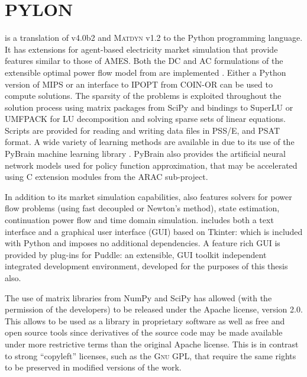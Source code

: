 \section{PYLON}
\label{sec:pylon}

\pylon is a translation of \matpower v4.0b2 and \textsc{Matdyn} v1.2 to the
Python programming language.  It has extensions for agent-based electricity
market simulation that provide features similar to those of AMES.  Both the DC
and AC formulations of the extensible optimal power flow model from \matpower
are implemented \cite{zimmerman:mp_pes}.  Either a Python version of MIPS or an
interface to IPOPT from COIN-OR can be used to compute solutions.  The sparsity
of the problems is exploited throughout the solution process using matrix
packages from SciPy and bindings to SuperLU or UMFPACK for LU decomposition and
solving sparse sets of linear equations. Scripts are provided for reading and
writing data files in PSS/E, \matpower and PSAT format. A wide variety of
learning methods are available in \pylon due to its use of the PyBrain machine
learning library \cite{schaul:2010}.  PyBrain also provides the artificial
neural network models used for policy function approximation, that may be
accelerated using C extension modules from the ARAC sub-project.

In addition to its market simulation capabilities, \pylon also features solvers
for power flow problems (using fast decoupled or Newton's method), state
estimation, continuation power flow and time domain simulation.  \pylon includes
both a text interface and a graphical user interface (GUI) based on Tkinter:
which is included with Python and imposes no additional dependencies.  A feature
rich GUI is provided by plug-ins for Puddle: an extensible, GUI toolkit
independent integrated development environment, developed for the purposes of
this thesis also.

The use of matrix
libraries from NumPy and SciPy has allowed \pylon (with the permission of the
\matpower developers) to be released under the Apache license, version 2.0. This
allows \pylon to be used as a library in proprietary software as well as
free and open source tools since derivatives of the source code may be made
available under more restrictive terms than the original Apache license.  This
is in contrast to strong ``copyleft'' licenses, such as the \textsc{Gnu} GPL,
that require the same rights to be preserved in modified versions of the work.

